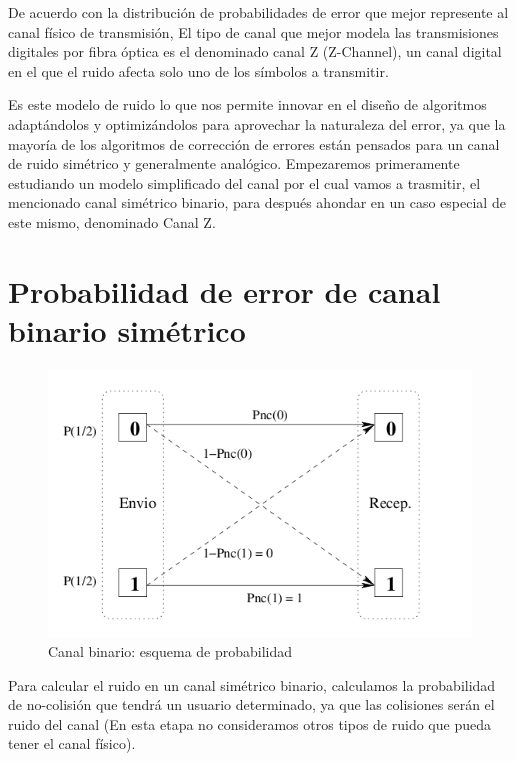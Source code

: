 De acuerdo con la distribución de probabilidades de error que mejor represente al canal físico de transmisión, 
El tipo de canal que mejor modela las transmisiones digitales por fibra óptica es el denominado canal Z (Z-Channel), un canal digital en el que el ruido afecta solo uno de los símbolos a transmitir.

Es este modelo de ruido lo que nos permite innovar en el diseño de algoritmos adaptándolos y optimizándolos para aprovechar la naturaleza del error, ya que la mayoría de los algoritmos de corrección de errores están pensados para un canal de ruido simétrico y generalmente analógico.
Empezaremos primeramente estudiando un modelo simplificado del canal por el cual vamos a trasmitir, el mencionado canal simétrico binario, para después ahondar en un caso especial de este mismo, denominado Canal Z.

\section{Probabilidad de error de canal binario simétrico}

\begin{figure}[t]
  \begin{center}
    \includegraphics[scale=0.43]{capacidad/canalBinario.png}
  \end{center}
\caption {Canal binario: esquema de probabilidad}
\label{fig:canbin}
\end{figure}

Para calcular el ruido en un canal simétrico binario, calculamos la probabilidad de no-colisión que tendrá un usuario determinado, ya que las colisiones serán el ruido del canal (En esta etapa no consideramos otros tipos de ruido que pueda tener el canal físico).

